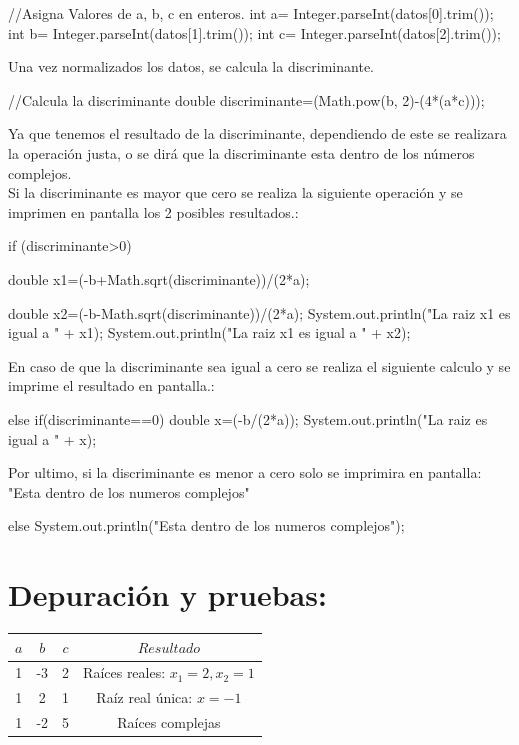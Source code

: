\documentclass{IEEEcsmag}
\begin{document}
\begin{javaCode}
    //Asigna Valores de a, b, c en enteros.
        int a= Integer.parseInt(datos[0].trim());
        int b= Integer.parseInt(datos[1].trim());
        int c= Integer.parseInt(datos[2].trim());
        
\end{javaCode}
Una vez normalizados los datos, se calcula la discriminante.
\begin{javaCode}
    //Calcula la discriminante
    double discriminante=(Math.pow(b, 2)-(4*(a*c)));
\end{javaCode}

Ya que tenemos el resultado de la discriminante, dependiendo de este se realizara la operación justa, o se dirá que la discriminante esta dentro de los números complejos.\\
Si la discriminante es mayor que cero se realiza la siguiente operación y se imprimen en pantalla los 2 posibles resultados.:
\begin{javaCode}
    if (discriminante>0) {
            double x1=(-b+Math.sqrt(discriminante))/(2*a);
            
            double x2=(-b-Math.sqrt(discriminante))/(2*a);
            System.out.println("La raiz x1 es igual a " + x1);
            System.out.println("La raiz x1 es igual a " + x2);
            
        }
\end{javaCode}
En caso de que la discriminante sea igual a cero se realiza el siguiente calculo y se imprime el resultado en pantalla.:
\begin{javaCode}
    else if(discriminante==0){
            double x=(-b/(2*a));
            System.out.println("La raiz es igual a " + x);
        }
\end{javaCode}
Por ultimo, si la discriminante es menor a cero solo se imprimira en pantalla:\\"Esta dentro de los numeros complejos"
\begin{javaCode}
    else{
            System.out.println("Esta dentro de los numeros complejos");
        }
\end{javaCode}

\section*{Depuración y pruebas:}
\begin{center}
\begin{tabular}{|c|c|c|c|}
\hline
\textbf{\(a\)} & \textbf{\(b\)} & \textbf{\(c\)} & \textbf{\(Resultado\)} \\
\hline
1 & -3 & 2 & Raíces reales: \(x_1 = 2, x_2 = 1\) \\
\hline
1 & 2 & 1 & Raíz real única: \(x = -1\) \\
\hline
1 & -2 & 5 & Raíces complejas \\
\hline
\end{tabular}
\end{center}
\end{document}
